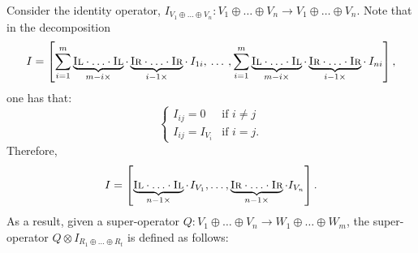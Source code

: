 Consider the identity operator, $I_{V_1 \oplus \ldots \oplus V_n}: V_1 \oplus \ldots \oplus V_n \rightarrow  V_1 \oplus \ldots \oplus V_n$. Note that in the decomposition 
$$I= \left[ \sum_{i=1}^{m} \underbrace{\textsc{Il} \cdot \ldots \cdot \textsc{Il}}_{m-i \times } \cdot  \underbrace{\textsc{Ir} \cdot \ldots \cdot \textsc{Ir}}_{i-1 \times } \cdot  \hspace{2pt} I_{1i},  \hspace{2pt} \ldots  \hspace{2pt}, \sum_{i=1}^{m} \underbrace{\textsc{Il} \cdot \ldots \cdot \textsc{Il}}_{m-i \times } \cdot  \underbrace{\textsc{Ir} \cdot \ldots \cdot \textsc{Ir}}_{i-1 \times } \cdot  \hspace{2pt} I_{ni}  \right],$$
one has that:
\begin{equation*}
  \begin{cases}
    I_{ij} = 0 & \text{if } i \neq j \\
    I_{ij} = I_{V_i} & \text{if } i = j.
  \end{cases}
\end{equation*}
Therefore,
 $$I = \left[\underbrace{\textsc{Il} \cdot \ldots \cdot \textsc{Il}}_{n-1 \times} \cdot \hspace{1pt}I_{V_1}, \ldots,  \underbrace{\textsc{Ir} \cdot \ldots \cdot \textsc{Ir}}_{n-1 \times} \cdot I_{V_n}\right].$$ 
 As a result, given a super-operator $Q: V_1 \oplus \ldots \oplus V_n \rightarrow W_1 \oplus \ldots \oplus W_m$, the super-operator $Q \otimes I_{R_1 \oplus \ldots \oplus R_t}$ is defined as follows:

